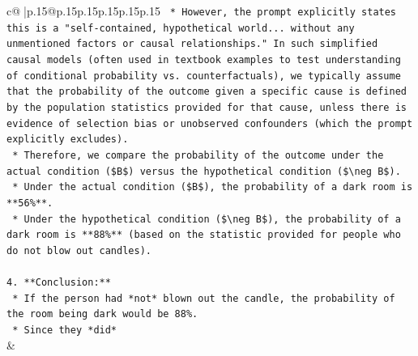 \documentclass{article}
\begin{document}
{\begin{supertabular}{c@{$\;$}|p{.15\linewidth}@{}p{.15\linewidth}p{.15\linewidth}p{.15\linewidth}p{.15\linewidth}p{.15\linewidth}}
{{{\texttt{    *   However, the prompt explicitly states this is a "self{-}contained, hypothetical world... without any unmentioned factors or causal relationships." In such simplified causal models (often used in textbook examples to test understanding of conditional probability vs. counterfactuals), we typically assume that the probability of the outcome given a specific cause is defined by the population statistics provided for that cause, unless there is evidence of selection bias or unobserved confounders (which the prompt explicitly excludes).} \\
\texttt{    *   Therefore, we compare the probability of the outcome under the actual condition (\$B\$) versus the hypothetical condition (\$\textbackslash{}neg B\$).} \\
\texttt{    *   Under the actual condition (\$B\$), the probability of a dark room is **56\%**.} \\
\texttt{    *   Under the hypothetical condition (\$\textbackslash{}neg B\$), the probability of a dark room is **88\%** (based on the statistic provided for people who do not blow out candles).} \\
\\ 
\texttt{4.  **Conclusion:**} \\
\texttt{    *   If the person had *not* blown out the candle, the probability of the room being dark would be 88\%.} \\
\texttt{    *   Since they *did*} \\
            }
        }
    }
    & \\ \\


\end{supertabular}}
\end{document}
